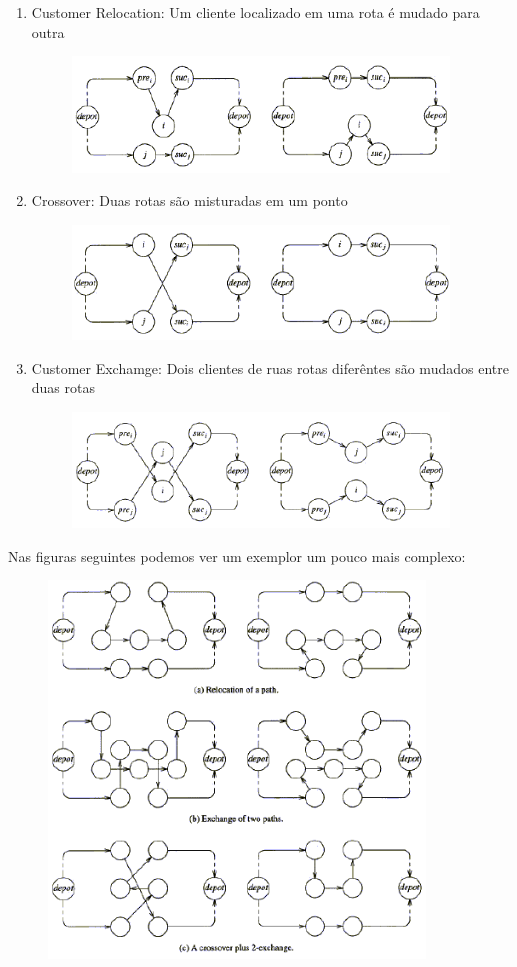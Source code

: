 \begin{enumerate}
\item Customer Relocation: Um cliente localizado em uma rota é mudado para outra

\begin{figure}[!ht]
\centering
\includegraphics[width=10cm]{fig/KindSavCR.png}
\end{figure}

\item Crossover: Duas rotas são misturadas em um ponto

\begin{figure}[!ht]
\centering
\includegraphics[width=10cm]{fig/KindSavC.png}
\end{figure}

\item Customer Exchamge: Dois clientes de ruas rotas diferêntes são mudados entre duas rotas

\begin{figure}[!ht]
\centering
\includegraphics[width=10cm]{fig/KindSavCE.png}
\end{figure}
\end{enumerate}

 Nas figuras seguintes podemos ver um exemplor um pouco mais complexo:

\begin{figure}[!ht]
\centering
\includegraphics[width=10cm]{fig/KindSav.png}
\end{figure}

